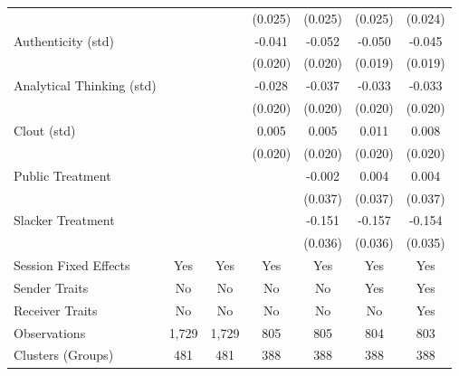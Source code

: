 \begin{tabular}{lcccccc}
                &                  &                  &  (0.025)         &  (0.025)         &  (0.025)         &  (0.024)         \\
Authenticity (std)&                  &                  &   -0.041\sym{**} &   -0.052\sym{**} &   -0.050\sym{***}&   -0.045\sym{**} \\
                &                  &                  &  (0.020)         &  (0.020)         &  (0.019)         &  (0.019)         \\
Analytical Thinking (std)&                  &                  &   -0.028         &   -0.037\sym{*}  &   -0.033\sym{*}  &   -0.033\sym{*}  \\
                &                  &                  &  (0.020)         &  (0.020)         &  (0.020)         &  (0.020)         \\
Clout (std)     &                  &                  &    0.005         &    0.005         &    0.011         &    0.008         \\
                &                  &                  &  (0.020)         &  (0.020)         &  (0.020)         &  (0.020)         \\
Public Treatment&                  &                  &                  &   -0.002         &    0.004         &    0.004         \\
                &                  &                  &                  &  (0.037)         &  (0.037)         &  (0.037)         \\
Slacker Treatment&                  &                  &                  &   -0.151\sym{***}&   -0.157\sym{***}&   -0.154\sym{***}\\
                &                  &                  &                  &  (0.036)         &  (0.036)         &  (0.035)         \\
Session Fixed Effects &      Yes         &      Yes         &      Yes         &      Yes         &      Yes         &      Yes         \\
Sender Traits   &       No         &       No         &       No         &       No         &      Yes         &      Yes         \\
Receiver Traits &       No         &       No         &       No         &       No         &       No         &      Yes         \\
\midrule
Observations    &    1,729         &    1,729         &      805         &      805         &      804         &      803         \\
Clusters (Groups)&      481         &      481         &      388         &      388         &      388         &      388         \\
\bottomrule
\end{tabular}
